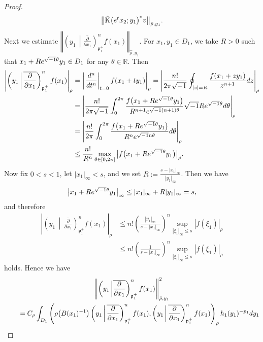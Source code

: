 \documentclass[11pt]{article}
\numberwithin{equation}{section}
\newcommand{\ds}{\displaystyle}
\newcommand{\BR}{\mathbb{R}}
\newcommand{\fp}{\mathfrak{p}}
\newcommand{\rK}{\mathrm{K}}
\begin{document}
\begin{proof}
\begin{gather*}
\big\Vert\hat{\rK}\big({\rm e}^tx_2;y_1\big)^*v\big\Vert_{\hat{\rho},y_1}.
\end{gather*}
Next we estimate
$\ds \left\Vert\left(y_1\,\middle|\overline{\frac{\partial}{\partial x_1}}\right)_{\fp^+_1}^nf(x_1)\right\Vert_{\hat{\rho},y_1}$.
For $x_1,y_1\in D_1$, we take $R>0$ such that $x_1+R{\rm e}^{\sqrt{-1}\theta}y_1\in D_1$ for any $\theta\in\BR$. Then
\begin{align*}
\left|\left(y_1\,\middle|\,\overline{\frac{\partial}{\partial x_1}}\right)_{\fp^+_1}^nf(x_1)\right|_\rho
&=\left|\left.\frac{{\rm d}^n}{{\rm d}t^n}\right|_{t=0}f(x_1+ty_1)\right|_\rho
=\left|\frac{n!}{2\pi\sqrt{-1}}\oint_{|z|=R}\frac{f(x_1+zy_1)}{z^{n+1}}{\rm d}z\right|_\rho \\
&=\left|\frac{n!}{2\pi\sqrt{-1}}\int_0^{2\pi}\frac{f\big(x_1+R{\rm e}^{\sqrt{-1}\theta}y_1\big)}{R^{n+1}{\rm e}^{\sqrt{-1}(n+1)\theta}}
\sqrt{-1}R{\rm e}^{\sqrt{-1}\theta}{\rm d}\theta\right|_\rho \\
&=\left|\frac{n!}{2\pi}\int_0^{2\pi}\frac{f\big(x_1+R{\rm e}^{\sqrt{-1}\theta}y_1\big)}{R^n{\rm e}^{\sqrt{-1}n\theta}}{\rm d}\theta\right|_\rho\\
& \le \frac{n!}{R^n}\max_{\theta\in[0,2\pi]}\big|f\big(x_1+R{\rm e}^{\sqrt{-1}\theta}y_1\big)\big|_\rho.
\end{align*}
Now fix $0<s<1$, let $|x_1|_\infty<s$, and we set $\ds R:=\frac{s-|x_1|_\infty}{|y_1|_\infty}$. Then we have
\begin{gather*} \big|x_1+R{\rm e}^{\sqrt{-1}\theta}y_1\big|_\infty\le |x_1|_\infty+R|y_1|_\infty=s, \end{gather*}
and therefore
\begin{align*}
\left|\left(y_1\,\middle|\,\overline{\frac{\partial}{\partial x_1}}\right)_{\fp^+_1}^nf(x_1)\right|_\rho
&\le n!\left(\frac{|y_1|_\infty}{s-|x_1|_\infty}\right)^n\sup_{|\xi_1|_\infty\le s}|f(\xi_1)|_\rho \\
&\le n!\left(\frac{1}{s-|x_1|_\infty}\right)^n\sup_{|\xi_1|_\infty\le s}|f(\xi_1)|_\rho
\end{align*}
holds. Hence we have
\begin{gather}
 \left\Vert\left(y_1\,\middle|\overline{\frac{\partial}{\partial x_1}}\right)_{\fp^+_1}^nf(x_1)\right\Vert_{\hat{\rho},y_1}^2 \notag \\
\qquad{} =C_\rho\int_{D_1} \left(\rho\big(B(x_1)^{-1}\big)\left(y_1\,\middle|\,\overline{\frac{\partial}{\partial x_1}}\right)_{\fp^+_1}^nf(x_1)
,\left(y_1\,\middle|\,\overline{\frac{\partial}{\partial x_1}}\right)_{\fp^+_1}^nf(x_1)\right)_\rho h_1(y_1)^{-p_1}{\rm d}y_1 \notag \\

\end{gather}
\end{proof}
\end{document}
